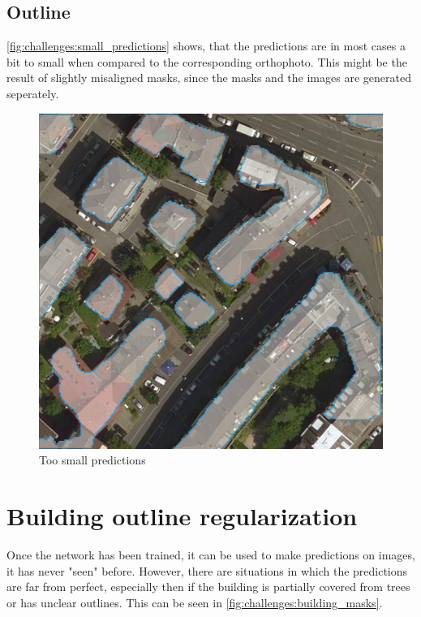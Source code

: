 \subsection{Outline}
\autoref{fig:challenges:small_predictions} shows, that the predictions are in most cases a bit to small when compared to the corresponding orthophoto. This might be the result of slightly misaligned masks, since the masks and the images are generated seperately.

\begin{figure}[H]
    \centering
	\includegraphics[width=0.6\linewidth]{chapters/challenges/images/small_predictions.png}
	\caption{Too small predictions}
	\label{fig:challenges:small_predictions}
\end{figure}


\section{Building outline regularization}
Once the network has been trained, it can be used to make predictions on images, it has never "seen" before. However, there are situations in which the predictions are far from perfect, especially then if the building is partially covered from trees or has unclear outlines. This can be seen in \autoref{fig:challenges:building_masks}.

